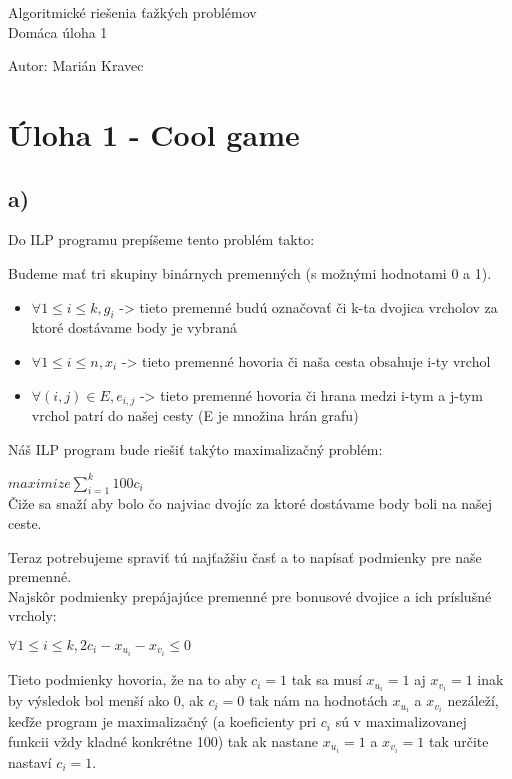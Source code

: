 \documentclass[a4paper]{article}
\begin{document}
 
	
\pagestyle{plain}

\begin{center}
	\sc\large
	Algoritmické riešenia ťažkých problémov\\
	Domáca úloha 1
\end{center}

Autor: Marián Kravec

\section{Úloha 1 - Cool game}

\subsection*{a)}

Do ILP programu prepíšeme tento problém takto:

Budeme mať tri skupiny binárnych premenných (s možnými hodnotami 0 a 1).
\begin{itemize}
	\item $\forall 1 \leq i \leq k, g_i$ -> tieto premenné budú označovať či k-ta dvojica vrcholov za ktoré dostávame body je vybraná
	\item $\forall 1 \leq i \leq n, x_i$ -> tieto premenné hovoria či naša cesta obsahuje i-ty vrchol
	\item $\forall (i, j) \in E, e_{i,j}$ -> tieto premenné hovoria či hrana medzi i-tym a j-tym vrchol patrí do našej cesty (E je množina hrán grafu)  
\end{itemize}

Náš ILP program bude riešiť takýto maximalizačný problém:

$maximize \sum_{i=1}^{k} 100 c_i$
\\

Čiže sa snaží aby bolo čo najviac dvojíc za ktoré dostávame body boli na našej ceste.
 
Teraz potrebujeme spraviť tú najťažšiu časť a to napísať podmienky pre naše premenné.
\\

Najskôr podmienky prepájajúce premenné pre bonusové dvojice a ich príslušné vrcholy:

$\forall 1 \leq i \leq k, 2 c_i - x_{u_i} - x_{v_i} \leq 0$

Tieto podmienky hovoria, že na to aby $c_i = 1$ tak sa musí $x_{u_i} = 1$ aj $x_{v_i} = 1$ inak by výsledok bol menší ako 0, ak $c_i = 0$ tak nám na hodnotách $x_{u_i}$ a $x_{v_i}$ nezáleží, keďže program je maximalizačný (a koeficienty pri $c_i$ sú v maximalizovanej funkcii vždy kladné konkrétne 100) tak ak nastane $x_{u_i} = 1$ a $x_{v_i} = 1$ tak určite nastaví $c_i = 1$.
\\
\end{document}
